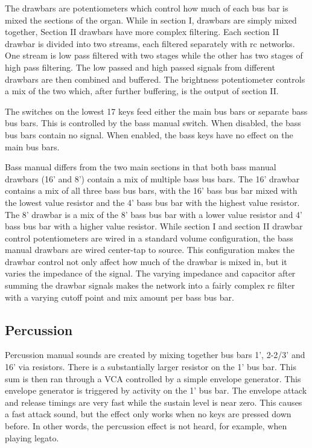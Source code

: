 \documentclass[11pt,a4paper]{article}
\begin{document}
The drawbars are potentiometers which control how much of each bus bar is mixed the sections of the organ. While in section I, drawbars are simply mixed together, Section II drawbars have more complex filtering. Each section II drawbar is divided into two streams, each filtered separately with rc networks. One stream is low pass filtered with two stages while the other has two stages of high pass filtering. The low passed and high passed signals from different drawbars are then combined and buffered. The brightness potentiometer controls a mix of the two which, after further buffering, is the output of section II. 

The switches on the lowest 17 keys feed either the main bus bars or separate bass bus bars. This is controlled by the bass manual switch. When disabled, the bass bus bars contain no signal. When enabled, the bass keys have no effect on the main bus bars.

Bass manual differs from the two main sections in that both bass manual drawbars (16' and 8') contain a mix of multiple bass bus bars. The 16' drawbar contains a mix of all three bass bus bars, with the 16' bass bus bar mixed with the lowest value resistor and the 4' bass bus bar with the highest value resistor. The 8' drawbar is a mix of the 8' bass bus bar with a lower value resistor and 4' bass bus bar with a higher value resistor. While section I and section II drawbar control potentiometers are wired in a standard volume configuration, the bass manual drawbars are wired center-tap to source. This configuration makes the drawbar control not only affect how much of the drawbar is mixed in, but it varies the impedance of the signal. The varying impedance and capacitor after summing the drawbar signals makes the network into a fairly complex rc filter with a varying cutoff point and mix amount per bass bus bar.

\subsection{Percussion}

Percussion manual sounds are created by mixing together bus bars 1', 2-2/3' and 16' via resistors. There is a substantially larger resistor on the 1' bus bar. This sum is then ran through a VCA controlled by a simple envelope generator. This envelope generator is triggered by activity on the 1' bus bar. The envelope attack and release timings are very fast while the sustain level is near zero. This causes a fast attack sound, but the effect only works when no keys are pressed down before. In other words, the percussion effect is not heard, for example, when playing legato.
\end{document}
